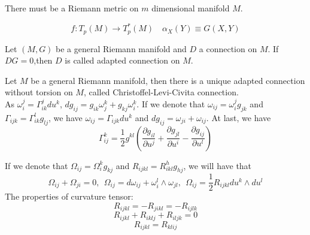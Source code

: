 \vspace{15pt}

\begin{newthem}
There must be a Riemann metric on $m$ dimensional manifold $M$.
\end{newthem}

\vspace{15pt}

\begin{newdef}
\[f:T_p(M) \to T^*_p(M) \quad \alpha_X(Y) \equiv G(X,Y)\]
\end{newdef}

\vspace{15pt}

\begin{newdef}
Let $(M,G)$ be a general Riemann manifold and $D$ a connection on $M$. If $DG=0$,then $D$ is called adapted connection on $M$.
\end{newdef}

\vspace{15pt}

\begin{newprop} 
Let $M$ be a general Riemann manifold, then there is a unique adapted connection without torsion on $M$, called Christoffel-Levi-Civita connection. \\
As $\omega^{j}_{i} = \Gamma^{j}_{ik}du^k$, $dg_{ij} = g_{ik}\omega^{k}_{j} + g_{kj}\omega^{k}_{i}$.
If we denote that $\omega_{ij} = \omega_{i}^{j}g_{jk}$ and $\Gamma_{ijk} = \Gamma_{ik}^{l}g_{lj}$, we have $\omega_{ij}=\Gamma_{ijk}du^k$ and $dg_{ij} = \omega_{ji}+ \omega_{ij}$.
At last, we have
\[\Gamma^{k}_{ij} = \frac{1}{2} g^{kl}(\frac{\partial g_{il}}{\partial u^j} + \frac{\partial g_{jl}}{\partial u^i} - \frac{\partial g_{ij}}{\partial u^l})\]
\end{newprop}

\begin{newprop}
If we denote that $\Omega_{ij} = \Omega_{i}^{k}g_{kj}$ and $R_{ijkl} = R^{h}_{ikl}g_{hj}$, we will have that
\[\Omega_{ij} + \Omega_{ji} = 0,\ \ \Omega_{ij} = d\omega_{ij} + \omega_{i}^{l} \wedge \omega_{jl},\ \ \Omega_{ij} = \frac{1}{2}R_{ijkl}du^k \wedge du^l\]
The properties of curvature tensor:
\[R_{ijkl} = -R_{jikl} = -R_{ijlk}\]
\[R_{ijkl}+R_{iklj}+R_{iljk}=0\]
\[R_{ijkl} = R_{klij}\]
\end{newprop}

